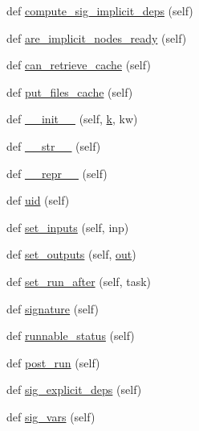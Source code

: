 \begin{DoxyCompactItemize}
\item 
def \hyperlink{classwaflib_1_1_task_1_1_task_adf3f63ea77fbca592ebc4244ba57887d}{compute\+\_\+sig\+\_\+implicit\+\_\+deps} (self)
\item 
def \hyperlink{classwaflib_1_1_task_1_1_task_a89612661d2073f53f62d7306a6c2238d}{are\+\_\+implicit\+\_\+nodes\+\_\+ready} (self)
\item 
def \hyperlink{classwaflib_1_1_task_1_1_task_a2085cfed25d49bed519af381621b29e7}{can\+\_\+retrieve\+\_\+cache} (self)
\item 
def \hyperlink{classwaflib_1_1_task_1_1_task_adf5e108580503738b2ab58eb1b56c10f}{put\+\_\+files\+\_\+cache} (self)
\item 
def \hyperlink{classwaflib_1_1_task_1_1_task_a566ab609bec4499aeab7bcd6f77f156e}{\+\_\+\+\_\+init\+\_\+\+\_\+} (self, \hyperlink{rfft2d_test_m_l_8m_adc468c70fb574ebd07287b38d0d0676d}{k}, kw)
\item 
def \hyperlink{classwaflib_1_1_task_1_1_task_a2507ae71718d699910a9dd8708664630}{\+\_\+\+\_\+str\+\_\+\+\_\+} (self)
\item 
def \hyperlink{classwaflib_1_1_task_1_1_task_ac05a045661750df307593224089759da}{\+\_\+\+\_\+repr\+\_\+\+\_\+} (self)
\item 
def \hyperlink{classwaflib_1_1_task_1_1_task_a910c51ea67c1c47ac40690bbba73b76a}{uid} (self)
\item 
def \hyperlink{classwaflib_1_1_task_1_1_task_a647c971bbca84d07daeff8d24f70ea18}{set\+\_\+inputs} (self, inp)
\item 
def \hyperlink{classwaflib_1_1_task_1_1_task_a8e650ed64c8370720574ebd8481a4f48}{set\+\_\+outputs} (self, \hyperlink{latency_8c_a71fd1c281affec034757279e4f91c50b}{out})
\item 
def \hyperlink{classwaflib_1_1_task_1_1_task_a84292828c5a6cf3282027ed8ce5c7822}{set\+\_\+run\+\_\+after} (self, task)
\item 
def \hyperlink{classwaflib_1_1_task_1_1_task_a48e55f13de8172b779a4e63794c7f44f}{signature} (self)
\item 
def \hyperlink{classwaflib_1_1_task_1_1_task_a2a281aaea77a0732f72103cfe4bc56c4}{runnable\+\_\+status} (self)
\item 
def \hyperlink{classwaflib_1_1_task_1_1_task_ac7c2e0bf22acd7d96399b1ca7f342232}{post\+\_\+run} (self)
\item 
def \hyperlink{classwaflib_1_1_task_1_1_task_a76a53025fb59fd6096f988ff64481070}{sig\+\_\+explicit\+\_\+deps} (self)
\item 
def \hyperlink{classwaflib_1_1_task_1_1_task_acffd01af005b390787b85239ac207282}{sig\+\_\+vars} (self)

\end{DoxyCompactItemize}

